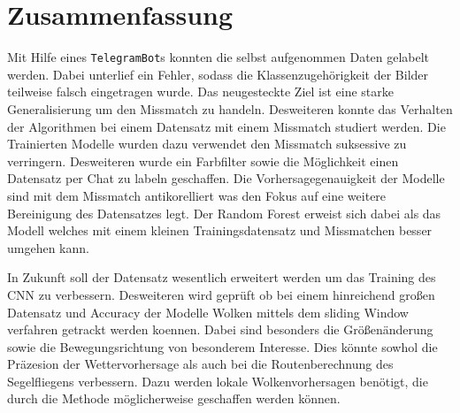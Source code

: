 \section{Zusammenfassung}
\label{sec:05_zusammenfassung}

Mit Hilfe eines \texttt{TelegramBot}s konnten die selbst aufgenommen
Daten gelabelt werden.
Dabei unterlief ein Fehler, sodass die Klassenzugehörigkeit der Bilder teilweise
falsch eingetragen wurde.
Das neugesteckte Ziel ist eine starke Generalisierung um den 
Missmatch zu handeln.
Desweiteren konnte das Verhalten der Algorithmen bei einem Datensatz
mit einem Missmatch studiert werden.
Die Trainierten Modelle wurden dazu verwendet den Missmatch 
suksessive zu verringern.
Desweiteren wurde ein Farbfilter sowie die Möglichkeit einen 
Datensatz per Chat zu labeln geschaffen.
Die Vorhersagegenauigkeit der Modelle sind mit dem Missmatch antikorelliert was
den Fokus auf eine weitere Bereinigung des Datensatzes legt.
Der Random Forest erweist sich dabei als das Modell welches mit 
einem kleinen Trainingsdatensatz und Missmatchen besser umgehen 
kann.

In Zukunft soll der Datensatz wesentlich erweitert werden um das 
Training des CNN zu verbessern.
Desweiteren wird geprüft ob bei einem hinreichend großen Datensatz und Accuracy
der Modelle Wolken mittels dem sliding Window verfahren getrackt werden koennen.
Dabei sind besonders die Größenänderung sowie die Bewegungsrichtung von
besonderem Interesse.
Dies könnte sowhol die Präzesion der Wettervorhersage als auch bei
die Routenberechnung des Segelfliegens verbessern. 
Dazu werden lokale Wolkenvorhersagen benötigt, die durch die Methode
möglicherweise geschaffen werden können.
